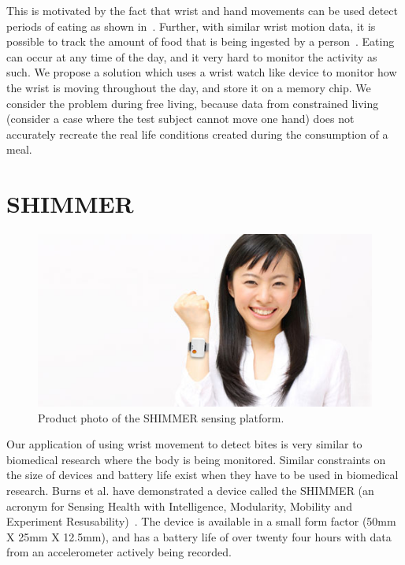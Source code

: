 
This is motivated by the fact that wrist and hand movements can be used detect periods of eating
as shown in~\cite{dong2013detecting}. Further, with similar wrist motion data,
it is possible to track the amount of food that is being ingested by a person~\cite{dong2012new}.
Eating can occur at any time of the day, and it very hard to monitor the activity as such.
We propose a solution which uses a wrist watch like device to monitor how the wrist is moving throughout the day,
and store it on a memory chip. We consider the problem during free living,
because data from constrained living (consider a case where the test subject cannot move one hand)
does not accurately recreate the real life conditions created during the consumption of a meal.



\section{SHIMMER}
\label{Sec:Shimmer}
\begin{figure}
\begin{center}
\includegraphics{images/shimmerphoto.jpg}
\caption{Product photo of the SHIMMER sensing platform.}
\label{Fig:ShimmerHand}
\end{center}
\end{figure}
Our application of using wrist movement to detect bites is very similar to biomedical research where the body is being monitored.
Similar constraints on the size of devices and battery life exist when they have to be used in biomedical research.
Burns et al. have demonstrated a device called the SHIMMER
(an acronym for Sensing Health with Intelligence, Modularity, Mobility and Experiment Resusability)~\cite{burns2010shimmer}.
The device is available in a small form factor (50mm X 25mm X 12.5mm),
and has a battery life of over twenty four hours with data from an accelerometer actively being recorded.
